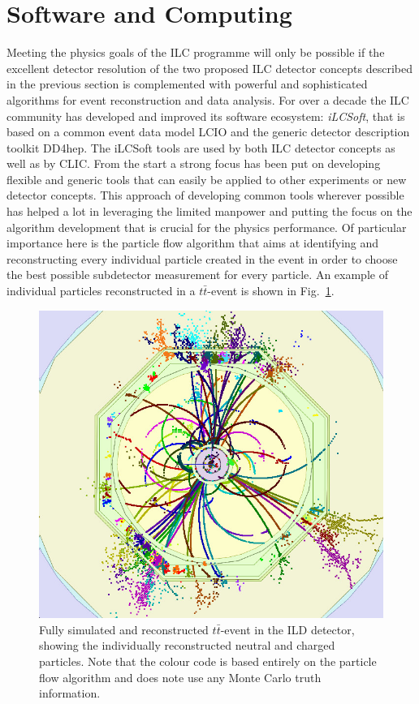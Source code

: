 \documentclass[%
 reprint,
 amsmath,amssymb,
 aps,
]{revtex4-1}
\newcommand{\todo}[1]{\textcolor{red}{{#1}}}
\def\Fig#1{Fig.~\ref{#1}}
\begin{document}

\section{\label{sec:soft}Software and Computing}

Meeting the physics goals of the ILC programme will only be possible if the excellent detector resolution
of the two proposed ILC detector concepts described in the previous section is complemented with powerful
and sophisticated algorithms for event reconstruction and data analysis.
For over a decade the ILC community has developed and improved its software ecosystem: \emph{iLCSoft}\cite{bib:ilcsoft}, that
is based on a common event data model LCIO\cite{bib:lcio} and the generic detector description toolkit DD4hep\cite{bib:dd4hep}. 
The iLCSoft tools are used by both ILC detector concepts as well as by CLIC.
From the start a strong focus has been put on developing flexible and generic tools that can easily be applied
to other experiments or new detector concepts. This approach of developing common tools wherever possible
has helped a lot in leveraging the limited manpower and putting the focus on the algorithm development that
is crucial for the physics performance. Of particular importance here is the particle flow algorithm that aims at identifying
and reconstructing every individual particle created in the event in order to choose the best possible subdetector measurement for every particle. 
An example of individual particles reconstructed in a $t\bar t$-event is shown in \Fig{fig:ttbarevent}.
\begin{figure}
\begin{center}
\includegraphics[width=0.95\hsize]{figures/ttbar_event_ILD.jpg}
\end{center}
\caption{Fully simulated and reconstructed $t\bar t$-event in the ILD detector, showing the individually reconstructed neutral and charged particles. Note that the colour code is based entirely on the particle flow algorithm and does note use any Monte Carlo truth information.}
\label{fig:ttbarevent}
\end{figure}
\end{document}
